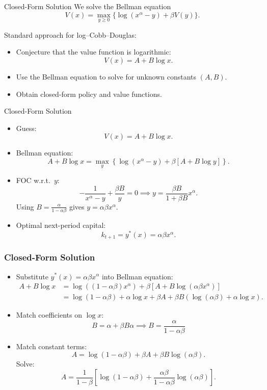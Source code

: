 \documentclass[9pt,aspectratio=169]{beamer}
\begin{document}
\begin{frame}{Closed-Form Solution}
We solve the Bellman equation
\[
V(x) = \max_{y\ge 0} \{\log(x^\alpha - y) + \beta V(y)\}.
\]

Standard approach for log–Cobb–Douglas:
\begin{itemize}
    \item Conjecture that the value function is logarithmic:
    \[
    V(x) = A + B\log x.
    \]
    \item Use the Bellman equation to solve for unknown constants $(A,B)$.
    \item Obtain closed-form policy and value functions.
\end{itemize}
\end{frame}

\begin{frame}{Closed-Form Solution}
    \begin{itemize}
        \item Guess:
        \[ V(x)=A+B\log x.
        \]
        \item Bellman equation:
        \[
            A + B\log x=
            \max_{y}
            \left\{
                \log(x^\alpha - y) + \beta\left[A + B\log y \right]
            \right\}.
        \]
        \item FOC w.r.t.\ $y$:
        \[
            -\frac{1}{x^\alpha - y} + \frac{\beta B}{y} = 0
            \implies y = \frac{\beta B}{1+\beta B}x^\alpha.
        \]
        Using $B=\frac{\alpha}{1-\alpha\beta}$ gives
        $y=\alpha\beta x^\alpha$.
        \item Optimal next-period capital:
        \[
            k_{t+1} = y^*(x) = \alpha\beta x^\alpha.
        \]
    \end{itemize}
\end{frame}


\begin{frame}
    \frametitle{Closed-Form Solution}
    \begin{itemize}
        \item Substitute $y^*(x)=\alpha\beta x^\alpha$ into Bellman equation:
        \begin{align*}
            A+B\log x &= \log\left((1-\alpha\beta)x^\alpha\right) +
            \beta\left[ A + B\log(\alpha\beta x^\alpha) \right]\\
            &= \log(1-\alpha\beta) + \alpha\log x + \beta A + \beta
            B\left(\log(\alpha\beta)+\alpha\log x\right).
        \end{align*}
        \item Match coefficients on $\log x$:
        \[ B = \alpha + \beta B \alpha \implies
            B = \frac{\alpha}{1-\alpha\beta}
        \]
        \item Match constant terms:
        \[
            A = \log(1-\alpha\beta) + \beta A + \beta B\log(\alpha\beta).
        \]
        Solve:
        \[
            A=\frac{1}{1-\beta}\left[ \log(1-\alpha\beta) +
                \frac{\alpha\beta}{1-\alpha\beta}\log(\alpha\beta) \right].
        \]
    \end{itemize}
\end{frame}
\end{document}
